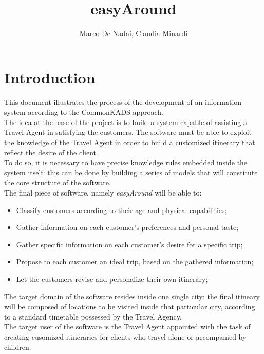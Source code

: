\documentclass[11pt]{article} %
\title{easyAround}
\author{Marco De Nadai, Claudia Minardi}
\begin{document}
\maketitle

\section{Introduction}
This document illustrates the process of the development of an information system according to the CommonKADS approach. \\
The idea at the base of the project is to build a system capable of assisting a Travel Agent in satisfying the customers. The software must be able to exploit the knowledge of the Travel Agent in order to build a customized itinerary that reflect the desire of the client. \\
To do so, it is necessary to have precise knowledge rules embedded inside the system itself: this can be done by building a series of models that will constitute the core structure of the software. \\
The final piece of software, namely \textit{easyAround} will be able to:
\begin{itemize}
\item Classify customers according to their age and physical capabilities;
\item Gather information on each customer's preferences and personal taste;
\item Gather specific information on each customer's desire for a specific trip;
\item Propose to each customer an ideal trip, based on the gathered information;
\item Let the customers revise and personalize their own itinerary;
\end{itemize}
The target domain of the software resides inside one single city: the final itineary will be composed of locations to be visited inside that particular city, according to a standard timetable possessed by the Travel Agency. \\
The target user of the software is the Travel Agent appointed with the task of creating cusomized itineraries for clients who travel alone or accompanied by children.
\newpage
\end{document}
